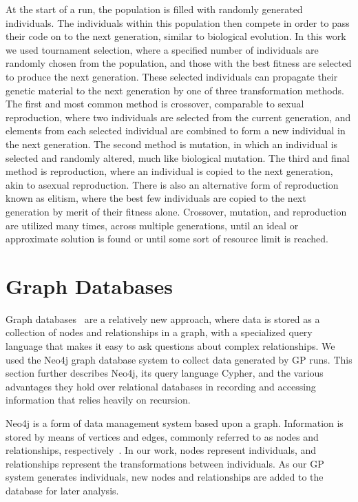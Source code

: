 \documentclass[12pt]{article}
\begin{document}
At the start of a run, the population is filled with randomly generated individuals. The individuals within this population then compete in order to pass their code on to the next generation, similar to biological evolution. In this work we used tournament selection, where a specified number of individuals are randomly chosen from the population, and those with the best fitness are selected to produce the next generation. These selected individuals can propagate their genetic material to the next generation by one of three transformation methods. The first and most common method is crossover, comparable to sexual reproduction, where two individuals are selected from the current generation, and elements from each selected individual are combined to form a new individual in the next generation. The second method is mutation, in which an individual is selected and randomly altered, much like biological mutation. The third and final method is reproduction, where an individual is copied to the next generation, akin to asexual reproduction. There is also an alternative form of reproduction known as elitism, where the best few individuals are copied to the next generation by merit of their fitness alone. Crossover, mutation, and reproduction are utilized many times, across multiple generations, until an ideal or approximate solution is found or until some sort of resource limit is reached.

\section{Graph Databases}
\label{sec:Graph Databases}

Graph databases~\cite{GraphDatabases:2013} are a relatively new approach, where data is stored as a collection of nodes and relationships in a graph, with a specialized query language that makes it easy to ask questions about complex relationships. We used the Neo4j graph database system to collect data generated by GP runs. This section further describes Neo4j, its query language Cypher, and the various advantages they hold over relational databases in recording and accessing information that relies heavily on recursion.

Neo4j is a form of data management system based upon a graph. Information is stored by means of vertices and edges, commonly referred to as nodes and relationships, respectively~\cite{GraphDatabases:2013}. In our work, nodes represent individuals, and relationships represent the transformations between individuals. As our GP system generates individuals, new nodes and relationships are added to the database for later analysis.
\end{document}
